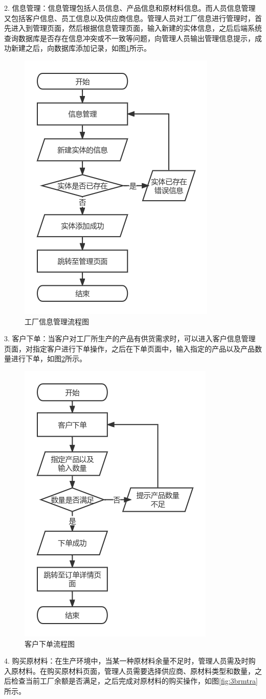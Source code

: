 2. 信息管理：信息管理包括人员信息、产品信息和原材料信息。而人员信息管理又包括客户信息、员工信息以及供应商信息。管理人员对工厂信息进行管理时，首先进入到管理页面，然后根据信息管理页面，输入新建的实体信息，之后后端系统查询数据库是否存在信息冲突或不一致等问题，向管理人员输出管理信息提示，成功新建之后，向数据库添加记录，如图\ref{fig:3ifmtmngmt}所示。

\begin{figure}[H]
    \centering
    \includegraphics[width=.35\textwidth]{figures/3ifmtmngmt.png}
    \caption{工厂信息管理流程图}
    \label{fig:3ifmtmngmt}
\end{figure}

3. 客户下单：当客户对工厂所生产的产品有供货需求时，可以进入客户信息管理页面，对指定客户进行下单操作，之后在下单页面中，输入指定的产品以及产品数量进行下单，如图\ref{fig:3odmngmt}所示。

\begin{figure}[H]
    \centering
    \includegraphics[width=.35\textwidth]{figures/3odmngmt.png}
    \caption{客户下单流程图}
    \label{fig:3odmngmt}
\end{figure}

4. 购买原材料：在生产环境中，当某一种原材料余量不足时，管理人员需及时购入原材料。在购买原材料页面，管理人员需要选择供应商、原材料类型和数量，之后检查当前工厂余额是否满足，之后完成对原材料的购买操作，如图\ref{fig:3brmtra}所示。

